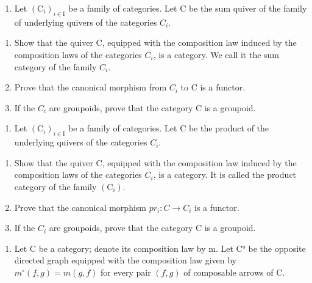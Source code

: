 \exercisegroup

\begin{enumerate}
\def\labelenumi{\arabic{enumi})}
\tightlist
\item
  Let \((\mathrm{C}_{i})_{i\in\mathrm{I}}\) be a family of categories. Let C be the sum quiver of the family of underlying quivers of the categories \(C_{i}\).
\end{enumerate}

\begin{enumerate}
\def\labelenumi{\alph{enumi})}
\item
  Show that the quiver C, equipped with the composition law induced by the composition laws of the categories \(C_{i}\), is a category. We call it the sum category of the family \(C_{i}\).
\item
  Prove that the canonical morphism from \(C_{i}\) to C is a functor.
\item
  If the \(C_{i}\) are groupoids, prove that the category C is a groupoid.
\end{enumerate}

\begin{enumerate}
\def\labelenumi{\arabic{enumi})}
\setcounter{enumi}{1}
\tightlist
\item
  Let \((\mathrm{C}_{i})_{i\in\mathrm{I}}\) be a family of categories. Let C be the product of the underlying quivers of the categories \(C_{i}\).
\end{enumerate}

\begin{enumerate}
\def\labelenumi{\alph{enumi})}
\item
  Show that the quiver C, equipped with the composition law induced by the composition laws of the categories \(C_{i}\), is a category. It is called the product category of the family \((\mathrm{C}_{i})\).
\item
  Prove that the canonical morphism \(pr_{i}: C \rightarrow C_{i}\) is a functor.
\item
  If the \(C_{i}\) are groupoids, prove that the category C is a groupoid.
\end{enumerate}

\begin{enumerate}
\def\labelenumi{\arabic{enumi})}
\setcounter{enumi}{2}
\tightlist
\item
  Let C be a category; denote its composition law by m. Let C° be the opposite directed graph equipped with the composition law given by \(m^{\circ}(f,g)=m(g,f)\) for every pair \((f,g)\) of composable arrows of C.
\end{enumerate}

